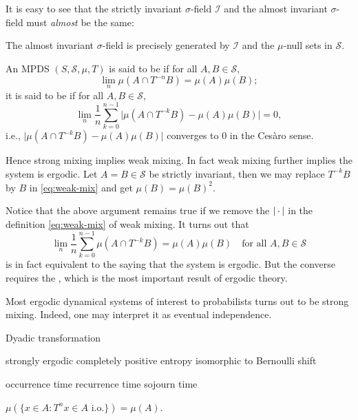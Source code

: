 It is easy to see that the strictly invariant $\sigma$-field $\mathcal I$ and the almost invariant $\sigma$-field must \emph{almost} be the same: \begin{fact}
    The almost invariant $\sigma$-field is precisely generated by $\mathcal I$ and the $\mu$-null sets in $\mathcal S$.
\end{fact}

\begin{defn}
    An MPDS $(S,\mathcal S,\mu,T)$ is said to be  if for all $A,B\in \mathcal S$, \begin{equation}
        \lim_n \mu(A\cap T^{-n} B) = \mu(A) \mu(B); \label{eq:strong-mix}
    \end{equation}
    it is said to be  if for all $A,B\in \mathcal S$,\begin{equation} \label{eq:weak-mix}
        \lim_n \frac{1}{n} \sum_{k=0}^{n-1} \bigl\lvert \mu(A \cap T^{-k} B) - \mu(A) \mu(B) \bigr\rvert = 0,
    \end{equation} i.e., $\bigl\lvert \mu(A \cap T^{-k} B) - \mu(A) \mu(B) \bigr\rvert$ converges to $0$ in the Cesàro sense.
\end{defn}

Hence strong mixing implies weak mixing. In fact weak mixing further implies the system is ergodic. Let $A = B\in \mathcal S$ be strictly invariant, then we may replace $T^{-k} B$ by $B$ in \eqref{eq:weak-mix} and get $\mu(B) = \mu(B)^2.$

Notice that the above argument remains true if we remove the $\lvert \,\cdot\, \rvert$ in the definition \eqref{eq:weak-mix} of weak mixing. It turns out that \[
    \lim_n \frac{1}{n} \sum_{k=0}^{n-1} \mu(A \cap T^{-k} B) = \mu(A)\mu(B)\quad \text{for all }A,B\in \mathcal S
\] is in fact equivalent to the saying that the system is ergodic. But the converse requires the , which is the most important result of ergodic theory.

Most ergodic dynamical systems of interest to probabilists turns out to be strong mixing. Indeed, one may interpret it as eventual independence.

Dyadic transformation

strongly ergodic
completely positive entropy
isomorphic to Bernoulli shift

occurrence time
recurrence time
sojourn time



\begin{namedthm}
    $\mu(\{x\in A: T^n x\in A \text{ i.o.}\}) = \mu(A)$.
\end{namedthm}

